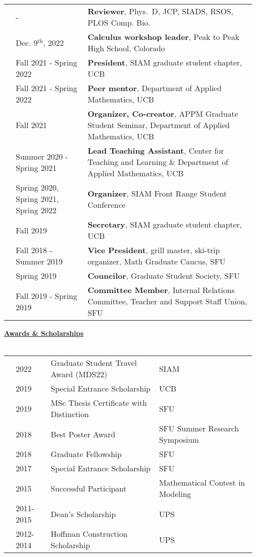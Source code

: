 \documentclass[letterpaper,11pt,oneside]{article}
\newcommand{\headr}[1]{\vspace{10pt}\uline{\Large{\textbf{#1}} \hfill } \\ \vspace{-10pt}\\}
\begin{document}
\begin{tabular}{@{} p{0.01cm} p{4.5cm} p{12cm}}
& - & {\bf Reviewer}, Phys.\ D, JCP, SIADS, RSOS, PLOS Comp. Bio.\\
& Dec. 9$^\text{th}$, 2022 & {\bf Calculus workshop leader}, Peak to Peak High School, Colorado \\ 
& Fall 2021 - Spring 2022 & \textbf{President}, SIAM graduate student chapter, UCB\\
& Fall 2021 - Spring 2022  & \textbf{Peer mentor}, Department of Applied Mathematics, UCB\\
& Fall 2021  & \textbf{Organizer, Co-creator}, APPM Graduate Student Seminar, Department of Applied Mathematics, UCB\\
& Summer 2020 - Spring 2021 & \textbf{Lead Teaching Assistant}, Center for Teaching and Learning \& Department of Applied Mathematics, UCB\\
& Spring 2020, Spring 2021, Spring 2022  & \textbf{Organizer}, SIAM Front Range Student Conference \\
& Fall 2019  & \textbf{Secretary}, SIAM graduate student chapter, UCB\\
& Fall 2018 - Summer 2019 & \textbf{Vice President}, grill master, ski-trip organizer, Math Graduate Caucus, SFU\\
& Spring 2019 & \textbf{Councilor}, Graduate Student Society, SFU\\
& Fall 2019 - Spring 2019 & \textbf{Committee Member}, Internal Relations Committee, Teacher and Support Staff Union, SFU \\
\end{tabular}

\headr{Awards \& Scholarships}

\begin{tabular}{@{} p{0.01cm} p{2cm} p{9cm} p{8cm}}
& 2022 & Graduate Student Travel Award (MDS22) & SIAM \\
& 2019 & Special Entrance Scholarship & UCB \\
& 2019 & MSc Thesis Certificate with Distinction & SFU \\
& 2018 & Best Poster Award & SFU Summer Research Symposium \\
& 2018 & Graduate Fellowship & SFU \\
& 2017 & Special Entrance Scholarship & SFU \\
& 2015 & Successful Participant & Mathematical Contest in Modeling \\
& 2011-2015 & Dean’s Scholarship & UPS\\
& 2012-2014 & Hoffman Construction Scholarship & UPS\\ 
\end{tabular}
\end{document}
